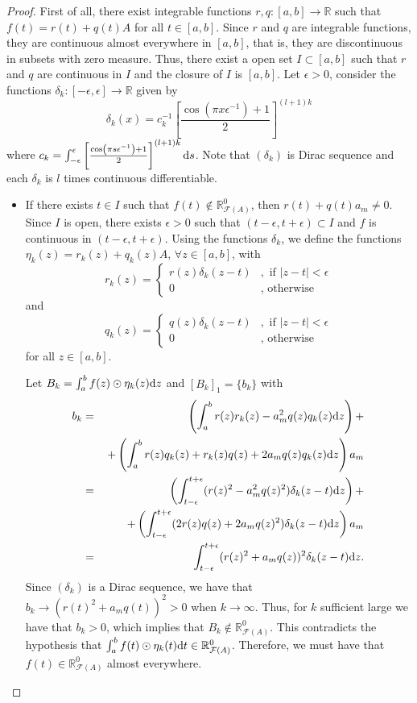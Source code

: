 \documentclass[12pt,a4paper]{article}
\newcommand{\RR}{\mathbb{R}}
\newcommand{\RFA}{\mathbb{R}_{\mathcal{F}(A)}}
\begin{document}
\begin{proof}
First of all, there exist integrable functions $r,q:[a,b]\to \RR$ such that $f(t) = r(t) + q(t)A$ for all $t \in [a,b]$. Since $r$ and $q$ are integrable functions, they are continuous almost everywhere in $[a,b]$, that is, they are discontinuous in subsets with zero measure. Thus, there exist a open set $I \subset [a,b]$ such that $r$ and $q$ are continuous in $I$ and  the closure of $I$ is $[a,b]$. 
Let $\epsilon> 0$, consider the functions $\delta_k:[-\epsilon,\epsilon]\to \RR$ given by 
$$
\delta_k(x) = c_k^{-1}\left[\frac{\cos\left(\pi x\epsilon^{-1}\right)+1}{2}\right]^{(l+1)k}
$$
where $c_k = \int_{-\epsilon}^\epsilon \left[\frac{\cos\left(\pi s\epsilon^{-1}\right)+1}{2}\right]^{(l+1)k} \textnormal{d}s$. Note that $(\delta_k)$ is Dirac sequence and each $\delta_k$ is $l$ times continuous differentiable.


\begin{itemize}
\item[(i)] If there exists $t \in I$ such that $f(t) \not\in \RFA^0$, then $r(t) + q(t)a_m \neq 0$.  
Since $I$ is open, there exists $\epsilon > 0$ such that $(t-\epsilon, t+\epsilon) \subset I$ and $f$ is continuous in $(t-\epsilon, t+\epsilon)$. 
Using the functions $\delta_k$, we define the functions $\eta_k(z) = r_k(z) + q_k(z)A$, $\forall z \in [a,b]$, with 
$$
r_k(z) = \left\lbrace\begin{array}{cl}
r(z)\delta_k(z-t)    &, \mbox{ if } |z-t|< \epsilon \\
0     &, \mbox{ otherwise}  
\end{array}\right.
$$
and 
$$
q_k(z) = \left\lbrace\begin{array}{cl}
q(z)\delta_k(z-t)    &, \mbox{ if } |z-t|< \epsilon \\
0     &, \mbox{ otherwise}  
\end{array}\right.
$$
for all $z \in [a,b].$

Let $B_k = \int_{a}^{b} f(z)\odot\eta_k(z)\textnormal{d}z$ and $[B_k]_1 = \{b_k\}$ with
\begin{eqnarray*}
b_k & = & \left(\int_{a}^{b} r(z)r_k(z) - a_m^2q(z)q_k(z) \textnormal{d}z\right) +  \\ &  & \, +   
\left(\int_{a}^{b} r(z)q_k(z) + r_k(z)q(z) + 2a_mq(z)q_k(z) \textnormal{d}z\right)a_m \\
& = & \left(\int_{t-\epsilon}^{t+\epsilon} (r(z)^2 - a_m^2q(z)^2)\delta_k(z-t) \textnormal{d}z\right) +   \\ &  & \, +    
\left(\int_{t-\epsilon}^{t+\epsilon} (2r(z)q(z) + 2a_mq(z)^2)\delta_k(z-t) \textnormal{d}z\right)a_m \\
& = & \int_{t-\epsilon}^{t+\epsilon} (r(z)^2 + a_mq(z))^2\delta_k(z-t) \textnormal{d}z.
\end{eqnarray*}
Since $(\delta_k)$ is a Dirac sequence, we have that $b_k \to (r(t)^2 + a_mq(t))^2 > 0$ when $k \to \infty$. Thus, for $k$ sufficient large we have that $b_k > 0$, which implies that $B_k \not\in \RFA^0$. This contradicts the hypothesis that $\int_{a}^{b} f(t)\odot\eta_k(t)\textnormal{d}t \in \RFA^0$. 
Therefore, we must have that $f(t) \in \RFA^0$ almost everywhere. 


\end{itemize}
\end{proof}
\end{document}
